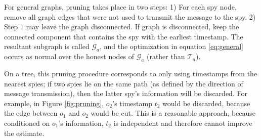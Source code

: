 For general graphs, pruning takes place in two steps: 1) For each spy node, remove all graph edges that were not used to transmit the message to the spy. 2) Step 1 may leave the graph disconnected. If graph is disconnected, keep the connected component that contains the spy with the earliest timestamp. The resultant subgraph is called $\mathcal G_a$, and the optimization in equation \ref{eq:general} occurs as normal over the honest nodes of $\mathcal G_a$ (rather than $\mathcal T_a$). 

On a tree, this pruning procedure corresponds to only using timestamps from the nearest spies; if two spies lie on the same path (as defined by the direction of message transmission), then the latter spy's information will be discarded. For example, in Figure \ref{fig:pruning}, $o_2$'s timestamp $t_2$ would be discarded, because the edge between $o_1$ and $o_2$ would be cut. This is a reasonable approach, because conditioned on $o_1$'s information, $t_2$ is independent and therefore cannot improve the estimate. 

